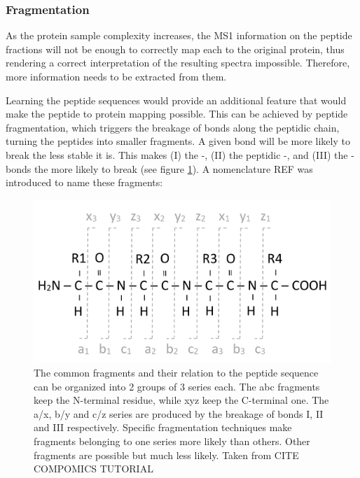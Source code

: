 \documentclass[11pt, a4paper]{report}
\begin{document}
\subsubsection{Fragmentation}
\label{subsubsec:fragmentation}

As the protein sample complexity increases, the \ac{MS1} information on the peptide fractions will not be enough to correctly map each to the original protein, thus rendering a correct interpretation of the resulting spectra impossible. Therefore, more information needs to be extracted from them.

Learning the peptide sequences would provide an additional feature that would make the peptide to protein mapping possible. This can be achieved by peptide fragmentation, which triggers the breakage of bonds along the peptidic chain, turning the peptides into smaller fragments. A given bond will be more likely to break the less stable it is. This makes (I) the -, (II) the peptidic -, and (III) the - bonds the more likely to break (see figure \ref{fig:abcxyz}). A nomenclature REF was introduced to name these fragments:

\begin{figure}[!h]
\includegraphics[width=\textwidth]{abcxyz}
\caption{The common fragments and their relation to the peptide sequence can be organized into 2 groups of 3 series each. The abc fragments keep the N-terminal residue, while xyz keep the C-terminal one. The a/x, b/y and c/z series are produced by the breakage of bonds I, II and III respectively. Specific fragmentation techniques make fragments belonging to one series more likely than others. Other fragments are possible but much less likely. Taken from CITE COMPOMICS TUTORIAL}
\label{fig:abcxyz}
\end{figure}
\end{document}
